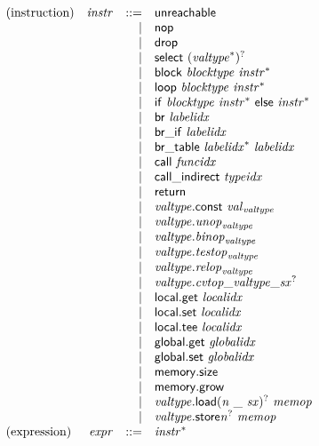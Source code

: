 $$
\begin{array}{@{}lrrl@{}l@{}}
\mbox{(instruction)} & {\mathit{instr}} &::=& \mathsf{unreachable} \\ &&|&
\mathsf{nop} \\ &&|&
\mathsf{drop} \\ &&|&
\mathsf{select}~{({{\mathit{valtype}}^\ast})^?} \\ &&|&
\mathsf{block}~{\mathit{blocktype}}~{{\mathit{instr}}^\ast} \\ &&|&
\mathsf{loop}~{\mathit{blocktype}}~{{\mathit{instr}}^\ast} \\ &&|&
\mathsf{if}~{\mathit{blocktype}}~{{\mathit{instr}}^\ast}~\mathsf{else}~{{\mathit{instr}}^\ast} \\ &&|&
\mathsf{br}~{\mathit{labelidx}} \\ &&|&
\mathsf{br\_if}~{\mathit{labelidx}} \\ &&|&
\mathsf{br\_table}~{{\mathit{labelidx}}^\ast}~{\mathit{labelidx}} \\ &&|&
\mathsf{call}~{\mathit{funcidx}} \\ &&|&
\mathsf{call\_indirect}~{\mathit{typeidx}} \\ &&|&
\mathsf{return} \\ &&|&
{\mathit{valtype}}.\mathsf{const}~{{\mathit{val}}}_{{\mathit{valtype}}} \\ &&|&
{\mathit{valtype}} . {{\mathit{unop}}}_{{\mathit{valtype}}} \\ &&|&
{\mathit{valtype}} . {{\mathit{binop}}}_{{\mathit{valtype}}} \\ &&|&
{\mathit{valtype}} . {{\mathit{testop}}}_{{\mathit{valtype}}} \\ &&|&
{\mathit{valtype}} . {{\mathit{relop}}}_{{\mathit{valtype}}} \\ &&|&
{\mathit{valtype}} . {{{{{\mathit{cvtop}}}{\mathsf{\_}}}{{\mathit{valtype}}}}{\mathsf{\_}}}{{{\mathit{sx}}^?}} \\ &&|&
\mathsf{local.get}~{\mathit{localidx}} \\ &&|&
\mathsf{local.set}~{\mathit{localidx}} \\ &&|&
\mathsf{local.tee}~{\mathit{localidx}} \\ &&|&
\mathsf{global.get}~{\mathit{globalidx}} \\ &&|&
\mathsf{global.set}~{\mathit{globalidx}} \\ &&|&
\mathsf{memory.size} \\ &&|&
\mathsf{memory.grow} \\ &&|&
{{\mathit{valtype}}.\mathsf{load}}{{({\mathit{n}}~\mathsf{\_}~{\mathit{sx}})^?}}~{\mathit{memop}} \\ &&|&
{{\mathit{valtype}}.\mathsf{store}}{{{\mathit{n}}^?}}~{\mathit{memop}} \\
\mbox{(expression)} & {\mathit{expr}} &::=& {{\mathit{instr}}^\ast} \\
\end{array}
$$

